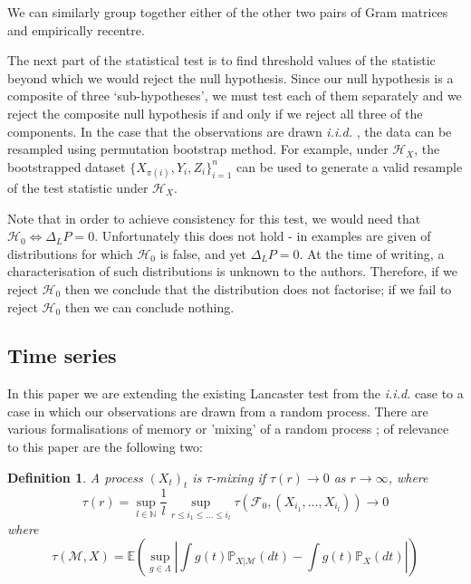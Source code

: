 \documentclass[]{article}
\newtheorem{definition}{Definition}
\begin{document}
We can similarly group together either of the other two pairs of Gram matrices and empirically recentre.


The next part of the statistical test is to find threshold values of the statistic beyond which we would reject the null hypothesis. Since our null hypothesis is a composite of three `sub-hypotheses', we must test each of them separately and we reject the composite null hypothesis if and only if we reject all three of the components. In the case that the observations are drawn \emph{i.i.d. }, the data can be resampled using permutation bootstrap method. For example, under $\mathcal{H}_X$, the bootstrapped dataset $\{X_{\pi(i)},Y_i,Z_i \}_{i=1}^n$ can be used to generate a valid resample of the test statistic under $\mathcal{H}_X$. 

Note that in order to achieve consistency for this test, we would need that $\mathcal{H}_0 \iff \Delta_LP = 0$. Unfortunately this does not hold - in \cite{sejdinovic2013kernel} examples are given of distributions for which $\mathcal{H}_0$ is false, and yet $\Delta_LP = 0$. At the time of writing, a characterisation of such distributions is unknown to the authors. Therefore, if we reject $\mathcal{H}_0$ then we conclude that the distribution does not factorise; if we fail to reject $\mathcal{H}_0$ then we can conclude nothing.

\subsection{Time series}
In this paper we are extending the existing Lancaster test from the \emph{i.i.d. } case to a case in which our observations are drawn from a random process. There are various formalisations of memory or 'mixing' of a random process \cite{doukhan1994mixing}\cite{bradley2005basic}\cite{dedecker2007weak}; of relevance to this paper are the following two:

\begin{definition}\cite{leucht2013dependent}
A process $(X_t)_{t}$ is \emph{$\tau$-mixing} if $\tau(r) \longrightarrow 0$ as $r\longrightarrow \infty$, where
\[\tau(r) = \sup_{l\in \mathbb{N}} \frac{1}{l} \sup_{r\leq i_1 \leq \ldots \leq i_l} \tau(\mathcal{F}_0,(X_{i_1}, \ldots, X_{i_l})) \longrightarrow 0\]
where
\[ \tau(\mathcal{M},X) = \mathbb{E} (\sup_{g \in \Lambda} | \int g(t) \mathbb{P}_{X|\mathcal{M}}(dt) -  \int g(t) \mathbb{P}_{X}(dt) |)\]
\end{definition}
\end{document}
